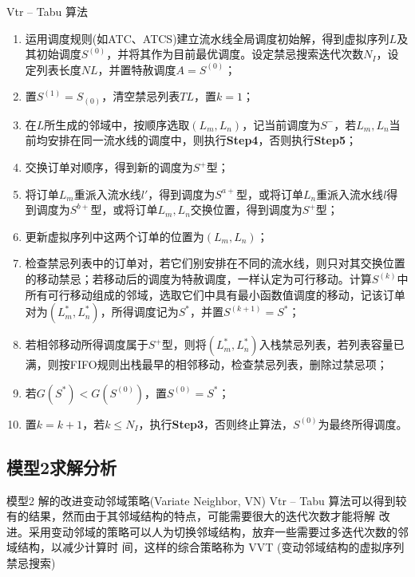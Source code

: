 \documentclass{beamer}
\newcommand{\Step}[1]{\textbf{Step#1}}
\begin{document}
\begin{frame}
\tiny
\begin{exampleblock}{Vtr -- Tabu 算法}
\begin{enumerate}[\bf Step1]
\item 运用调度规则(如ATC、ATCS)建立流水线全局调度初始解，得到虚拟序列$L$及其初始调度$S^{(0)}$，并将其作为目前最优调度。设定禁忌搜索迭代次数$N_I$，设定列表长度$NL$，并置特赦调度$A = S^{(0)}$；
\item 置$S^{(1)} = S_{(0)}$，清空禁忌列表$TL$，置$k = 1$；
\item 在$L$所生成的邻域中，按顺序选取$(L_m, L_n)$，记当前调度为$S^-$，若$L_m, L_n$当前均安排在同一流水线的调度中，则执行\Step{4}，否则执行\Step{5}；
\item 交换订单对顺序，得到新的调度为$S^+$型；
\item 将订单$L_m$重派入流水线$l'$，得到调度为$S^{a+}$型，或将订单$L_n$重派入流水线$l$得到调度为$S^{b+}$型，或将订单$L_m, L_n$交换位置，得到调度为$S^+$型；
\item 更新虚拟序列中这两个订单的位置为$(L_m, L_n)$；
\item 检查禁忌列表中的订单对，若它们别安排在不同的流水线，则只对其交换位置的移动禁忌；若移动后的调度为特赦调度，一样认定为可行移动。计算$S^{(k)}$中所有可行移动组成的邻域，选取它们中具有最小函数值调度的移动，记该订单对为$(L_m^*, L_n^*)$，所得调度记为$S^*$，并置$S^{(k+1)} = S^*$；
\item 若相邻移动所得调度属于$S^+$型，则将$(L_m^*, L_n^*)$入栈禁忌列表，若列表容量已满，则按FIFO规则出栈最早的相邻移动，检查禁忌列表，删除过禁忌项；
\item 若$G(S^*) < G(S^{(0)})$，置$S^{(0)} = S^*$；
\item 置$k = k + 1$，若$k\le N_I$，执行\Step{3}，否则终止算法，$S^{(0)}$为最终所得调度。
\end{enumerate}
\end{exampleblock}
\end{frame}
\subsection{模型2求解分析}
\begin{frame}{模型2 解的改进}{变动邻域策略(Variate Neighbor, VN)}
Vtr – Tabu 算法可以得到较有的结果，然而由于其邻域结构的特点，可能需要很大的迭代次数才能将解
改进。采用变动邻域的策略可以人为切换邻域结构，放弃一些需要过多迭代次数的邻域结构，以减少计算时
间，这样的综合策略称为 VVT (变动邻域结构的虚拟序列禁忌搜索)
\end{frame}
\end{document}
